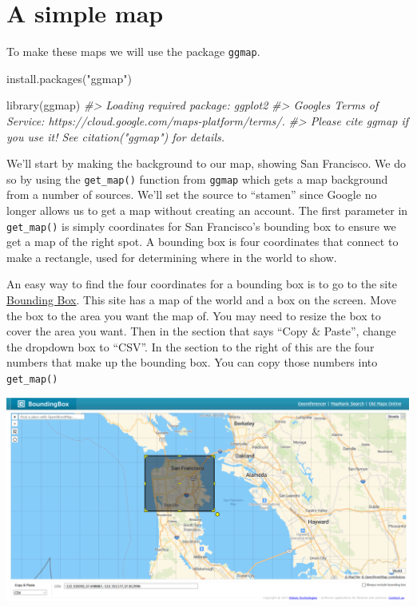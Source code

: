 \documentclass[
  12pt,
  openany]{book}
\newenvironment{Shaded}{\begin{snugshade}}{\end{snugshade}}
\newcommand{\CommentTok}[1]{\textcolor[rgb]{0.37,0.37,0.37}{\textit{#1}}}
\newcommand{\FunctionTok}[1]{\textcolor[rgb]{0,0,0}{#1}}
\newcommand{\NormalTok}[1]{#1}
\newcommand{\StringTok}[1]{\textcolor[rgb]{0.5,0.5,0.5}{#1}}
\begin{document}
\hypertarget{a-simple-map}{%
\section{A simple map}\label{a-simple-map}}

To make these maps we will use the package \texttt{ggmap}.

\begin{Shaded}
\begin{Highlighting}[]
\FunctionTok{install.packages}\NormalTok{(}\StringTok{"ggmap"}\NormalTok{)}
\end{Highlighting}
\end{Shaded}

\begin{Shaded}
\begin{Highlighting}[]
\FunctionTok{library}\NormalTok{(ggmap)}
\CommentTok{\#\textgreater{} Loading required package: ggplot2}
\CommentTok{\#\textgreater{} Google\textquotesingle{}s Terms of Service: https://cloud.google.com/maps{-}platform/terms/.}
\CommentTok{\#\textgreater{} Please cite ggmap if you use it! See citation("ggmap") for details.}
\end{Highlighting}
\end{Shaded}

We'll start by making the background to our map, showing San Francisco. We do so by using the \texttt{get\_map()} function from \texttt{ggmap} which gets a map background from a number of sources. We'll set the source to ``stamen'' since Google no longer allows us to get a map without creating an account. The first parameter in \texttt{get\_map()} is simply coordinates for San Francisco's bounding box to ensure we get a map of the right spot. A bounding box is four coordinates that connect to make a rectangle, used for determining where in the world to show.

An easy way to find the four coordinates for a bounding box is to go to the site \href{https://boundingbox.klokantech.com/}{Bounding Box}. This site has a map of the world and a box on the screen. Move the box to the area you want the map of. You may need to resize the box to cover the area you want. Then in the section that says ``Copy \& Paste'', change the dropdown box to ``CSV''. In the section to the right of this are the four numbers that make up the bounding box. You can copy those numbers into \texttt{get\_map()}

\includegraphics{images/bounding_box.PNG}
\end{document}
